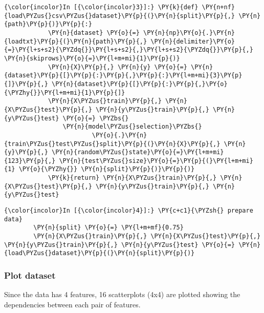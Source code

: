     \begin{Verbatim}[commandchars=\\\{\}]
{\color{incolor}In [{\color{incolor}3}]:} \PY{k}{def} \PY{n+nf}{load\PYZus{}csv\PYZus{}dataset}\PY{p}{(}\PY{n}{split}\PY{p}{,} \PY{n}{path}\PY{p}{)}\PY{p}{:}
            \PY{n}{dataset} \PY{o}{=} \PY{n}{np}\PY{o}{.}\PY{n}{loadtxt}\PY{p}{(}\PY{n}{path}\PY{p}{,} \PY{n}{delimiter}\PY{o}{=}\PY{l+s+s2}{\PYZdq{}}\PY{l+s+s2}{,}\PY{l+s+s2}{\PYZdq{}}\PY{p}{,} \PY{n}{skiprows}\PY{o}{=}\PY{l+m+mi}{1}\PY{p}{)}
            \PY{n}{X}\PY{p}{,} \PY{n}{y} \PY{o}{=} \PY{n}{dataset}\PY{p}{[}\PY{p}{:}\PY{p}{,}\PY{p}{:}\PY{l+m+mi}{3}\PY{p}{]}\PY{p}{,} \PY{n}{dataset}\PY{p}{[}\PY{p}{:}\PY{p}{,}\PY{o}{\PYZhy{}}\PY{l+m+mi}{1}\PY{p}{]}
            \PY{n}{X\PYZus{}train}\PY{p}{,} \PY{n}{X\PYZus{}test}\PY{p}{,} \PY{n}{y\PYZus{}train}\PY{p}{,} \PY{n}{y\PYZus{}test} \PY{o}{=} \PYZbs{}
                \PY{n}{model\PYZus{}selection}\PYZbs{}
                        \PY{o}{.}\PY{n}{train\PYZus{}test\PYZus{}split}\PY{p}{(}\PY{n}{X}\PY{p}{,} \PY{n}{y}\PY{p}{,} \PY{n}{random\PYZus{}state}\PY{o}{=}\PY{l+m+mi}{123}\PY{p}{,} \PY{n}{test\PYZus{}size}\PY{o}{=}\PY{p}{(}\PY{l+m+mi}{1} \PY{o}{\PYZhy{}} \PY{n}{split}\PY{p}{)}\PY{p}{)}
            \PY{k}{return} \PY{n}{X\PYZus{}train}\PY{p}{,} \PY{n}{X\PYZus{}test}\PY{p}{,} \PY{n}{y\PYZus{}train}\PY{p}{,} \PY{n}{y\PYZus{}test}
\end{Verbatim}

    \begin{Verbatim}[commandchars=\\\{\}]
{\color{incolor}In [{\color{incolor}4}]:} \PY{c+c1}{\PYZsh{} prepare data}
        \PY{n}{split} \PY{o}{=} \PY{l+m+mf}{0.75}
        \PY{n}{X\PYZus{}train}\PY{p}{,} \PY{n}{X\PYZus{}test}\PY{p}{,} \PY{n}{y\PYZus{}train}\PY{p}{,} \PY{n}{y\PYZus{}test} \PY{o}{=} \PY{n}{load\PYZus{}dataset}\PY{p}{(}\PY{n}{split}\PY{p}{)}
\end{Verbatim}

    \hypertarget{plot-dataset}{%
\subsubsection{Plot dataset}\label{plot-dataset}}

Since the data has 4 features, 16 scatterplots (4x4) are plotted showing
the dependencies between each pair of features.

